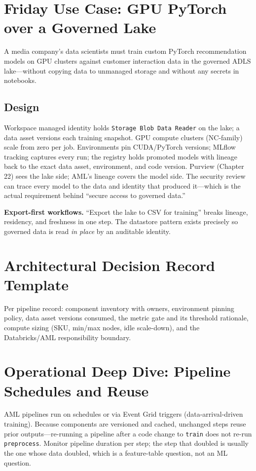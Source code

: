\section{Friday Use Case: GPU PyTorch over a Governed Lake}
A media company's data scientists must train custom PyTorch recommendation models on GPU clusters against customer interaction data in the governed ADLS lake---without copying data to unmanaged storage and without any secrets in notebooks.

\subsection{Design}
Workspace managed identity holds \texttt{Storage Blob Data Reader} on the lake; a data asset versions each training snapshot. GPU compute clusters (NC-family) scale from zero per job. Environments pin CUDA/PyTorch versions; MLflow tracking captures every run; the registry holds promoted models with lineage back to the exact data asset, environment, and code version. Purview (Chapter 22) sees the lake side; AML's lineage covers the model side. The security review can trace every model to the data and identity that produced it---which is the actual requirement behind ``secure access to governed data.''

\begin{pitfall}
\textbf{Export-first workflows.} ``Export the lake to CSV for training'' breaks lineage, residency, and freshness in one step. The datastore pattern exists precisely so governed data is read \emph{in place} by an auditable identity.
\end{pitfall}

\section{Architectural Decision Record Template}
Per pipeline record: component inventory with owners, environment pinning policy, data asset versions consumed, the metric gate and its threshold rationale, compute sizing (SKU, min/max nodes, idle scale-down), and the Databricks/AML responsibility boundary.

\section{Operational Deep Dive: Pipeline Schedules and Reuse}
AML pipelines run on schedules or via Event Grid triggers (data-arrival-driven training). Because components are versioned and cached, unchanged steps reuse prior outputs---re-running a pipeline after a code change to \texttt{train} does not re-run \texttt{preprocess}. Monitor pipeline duration per step; the step that doubled is usually the one whose data doubled, which is a feature-table question, not an ML question.

